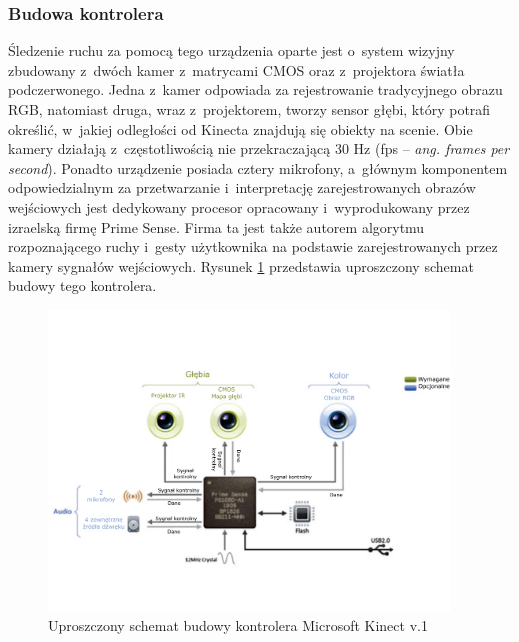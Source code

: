 \subsubsection*{Budowa kontrolera}
Śledzenie ruchu za pomocą tego urządzenia oparte jest o~system wizyjny zbudowany z~dwóch kamer z~matrycami CMOS oraz z~projektora światła podczerwonego. Jedna z~kamer odpowiada za rejestrowanie tradycyjnego obrazu RGB, natomiast druga, wraz z~projektorem, tworzy sensor głębi, który potrafi określić, w~jakiej odległości od Kinecta znajdują się obiekty na scenie. Obie kamery działają z~częstotliwością nie przekraczającą 30 Hz (fps -- \emph{ang. frames per second}). Ponadto urządzenie posiada cztery mikrofony, a~głównym komponentem odpowiedzialnym za przetwarzanie i~interpretację zarejestrowanych obrazów wejściowych jest dedykowany procesor opracowany i~wyprodukowany przez izraelską firmę Prime Sense. Firma ta jest także autorem algorytmu rozpoznającego ruchy i~gesty użytkownika na podstawie zarejestrowanych przez kamery sygnałów wejściowych. Rysunek \ref{fig:characteristics:kinect:inside} przedstawia uproszczony schemat budowy tego kontrolera. 
																													
\begin{savenotes}
	\begin{figure}
		\centering
		\includegraphics[width=0.95\textwidth]{images/kinectSchema.png}
		\caption[Uproszczony schemat budowy kontrolera Microsoft Kinect v.1]{Uproszczony schemat budowy kontrolera Microsoft Kinect v.1 }
		\label{fig:characteristics:kinect:inside} 
	\end{figure}
\end{savenotes}
																															
